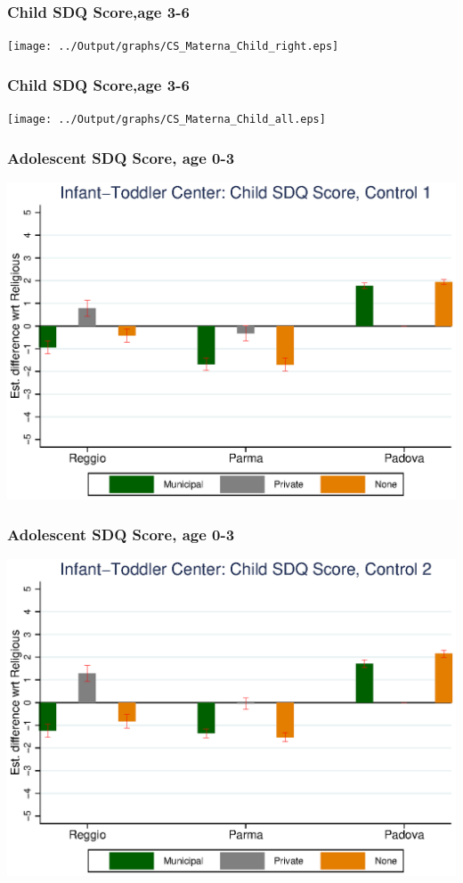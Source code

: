 \documentclass{beamer}
\begin{document}
\begin{frame}\frametitle{Child SDQ Score,age 3-6}
\center
\texttt{[image: ../Output/graphs/CS\_Materna\_Child\_right.eps]}
\end{frame}

\begin{frame}\frametitle{Child SDQ Score,age 3-6}
\center
\texttt{[image: ../Output/graphs/CS\_Materna\_Child\_all.eps]}
\end{frame}

\begin{frame}\frametitle{Adolescent SDQ Score, age 0-3}
\center
\includegraphics[scale=0.7]{../Output/graphs/CS_Asilo_Adol_main.eps}
\end{frame}

\begin{frame}\frametitle{Adolescent SDQ Score, age 0-3}
\center
\includegraphics[scale=0.7]{../Output/graphs/CS_Asilo_Adol_inter.eps}
\end{frame}
\end{document}
